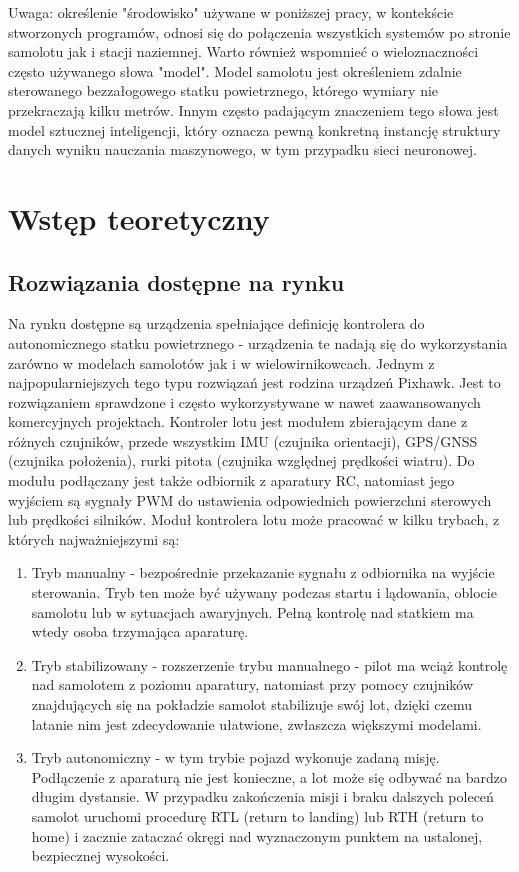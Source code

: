 \documentclass[12pt, a4paper]{article}
\begin{document}
Uwaga: określenie "środowisko" używane w poniższej pracy, w kontekście stworzonych programów, odnosi się do połączenia wszystkich systemów po stronie samolotu jak i stacji naziemnej. Warto również wspomnieć o wieloznaczności często używanego słowa "model". Model samolotu jest określeniem zdalnie sterowanego bezzałogowego statku powietrznego, którego wymiary nie przekraczają kilku metrów. Innym często padającym znaczeniem tego słowa jest model sztucznej inteligencji, który oznacza pewną konkretną instancję struktury danych wyniku nauczania maszynowego, w tym przypadku sieci neuronowej.

\clearpage
\section{Wstęp teoretyczny}

\subsection{Rozwiązania dostępne na rynku}
Na rynku dostępne są urządzenia spełniające definicję kontrolera do autonomicznego statku powietrznego - urządzenia te nadają się do wykorzystania zarówno w modelach samolotów jak i w wielowirnikowcach. Jednym z najpopularniejszych tego typu rozwiązań jest rodzina urządzeń Pixhawk. Jest to rozwiązaniem sprawdzone i często wykorzystywane w nawet zaawansowanych komercyjnych projektach. Kontroler lotu jest modułem zbierającym dane z różnych czujników, przede wszystkim IMU (czujnika orientacji), GPS/GNSS (czujnika położenia), rurki pitota (czujnika względnej prędkości wiatru). Do modułu podłączany jest także odbiornik z aparatury RC, natomiast jego wyjściem są sygnały PWM do ustawienia odpowiednich powierzchni sterowych lub prędkości silników. 
Moduł kontrolera lotu może pracować w kilku trybach, z których najważniejszymi są:
\begin{enumerate}


	\item Tryb manualny - bezpośrednie przekazanie sygnału z odbiornika na wyjście sterowania. Tryb ten może być używany podczas startu i lądowania, oblocie samolotu lub w sytuacjach awaryjnych. Pełną kontrolę nad statkiem ma wtedy osoba trzymająca aparaturę.
	\item Tryb stabilizowany - rozszerzenie trybu manualnego - pilot ma wciąż kontrolę nad samolotem z poziomu aparatury, natomiast przy pomocy czujników znajdujących się na pokładzie samolot stabilizuje swój lot, dzięki czemu latanie nim jest zdecydowanie ułatwione, zwłaszcza większymi modelami.
	\item Tryb autonomiczny - w tym trybie pojazd wykonuje zadaną misję. Podłączenie z aparaturą nie jest konieczne, a lot może się odbywać na bardzo długim dystansie. W przypadku zakończenia misji i braku dalszych poleceń samolot uruchomi procedurę RTL (return to landing) lub RTH (return to home) i zacznie zataczać okręgi nad wyznaczonym punktem na ustalonej, bezpiecznej wysokości.

\end{enumerate}
	
\end{document}
